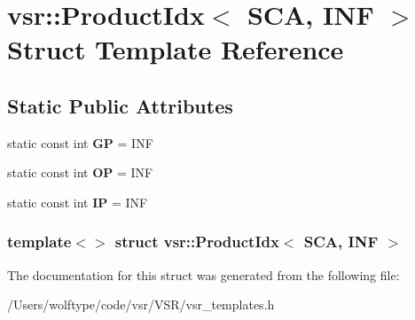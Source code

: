 \hypertarget{structvsr_1_1_product_idx_3_01_s_c_a_00_01_i_n_f_01_4}{\section{vsr\-:\-:Product\-Idx$<$ S\-C\-A, I\-N\-F $>$ Struct Template Reference}
\label{structvsr_1_1_product_idx_3_01_s_c_a_00_01_i_n_f_01_4}
}
\subsection*{Static Public Attributes}
\begin{DoxyCompactItemize}
\item 
\hypertarget{structvsr_1_1_product_idx_3_01_s_c_a_00_01_i_n_f_01_4_ae5e4ab79a70b6bc8d449ee6c271bba44}{static const int {\bfseries G\-P} = I\-N\-F}\label{structvsr_1_1_product_idx_3_01_s_c_a_00_01_i_n_f_01_4_ae5e4ab79a70b6bc8d449ee6c271bba44}

\item 
\hypertarget{structvsr_1_1_product_idx_3_01_s_c_a_00_01_i_n_f_01_4_a1cb467bfee2b56dc1265a957d12a93a3}{static const int {\bfseries O\-P} = I\-N\-F}\label{structvsr_1_1_product_idx_3_01_s_c_a_00_01_i_n_f_01_4_a1cb467bfee2b56dc1265a957d12a93a3}

\item 
\hypertarget{structvsr_1_1_product_idx_3_01_s_c_a_00_01_i_n_f_01_4_a80afcc834266f61099f5344b929dea76}{static const int {\bfseries I\-P} = I\-N\-F}\label{structvsr_1_1_product_idx_3_01_s_c_a_00_01_i_n_f_01_4_a80afcc834266f61099f5344b929dea76}

\end{DoxyCompactItemize}
\subsubsection*{template$<$$>$ struct vsr\-::\-Product\-Idx$<$ S\-C\-A, I\-N\-F $>$}



The documentation for this struct was generated from the following file\-:\begin{DoxyCompactItemize}
\item 
/\-Users/wolftype/code/vsr/\-V\-S\-R/vsr\-\_\-templates.\-h\end{DoxyCompactItemize}
